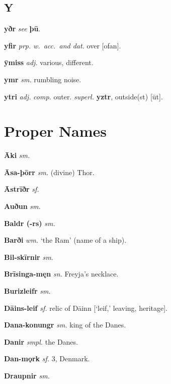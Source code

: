\documentclass[12pt,letterpaper]{book}
\newcommand\emptypage{\clearpage{\pagestyle{empty}\cleardoublepage}}
\begin{document}
\emptypage

\chapter*{Y}

\noindent
\textbf{yðr} \textit{} \textit{see} \textbf{þū}.

\noindent
\textbf{yfir} \textit{prp.} \textit{w.\ acc.\ and dat.} over [ofan].

\noindent
\textbf{ȳmiss} \textit{adj.} various, different.

\noindent
\textbf{ymr} \textit{sm.} rumbling noise.

\noindent
\textbf{ytri} \textit{adj.} \textit{comp.} outer.  \textit{superl.} \textbf{yztr},
	outside(st) [ūt].



\part{Proper Names}

\noindent
\textbf{Āki} \textit{sm.} 

\noindent
\textbf{Āsa-þōrr} \textit{sm.} (divine) Thor.

\noindent
\textbf{Āstrīðr} \textit{sf.} 

\noindent
\textbf{Auðun} \textit{sm.} 

\vspace{\baselineskip}

\noindent
\textbf{Baldr (-rs)} \textit{sm.} 

\noindent
\textbf{Barði} \textit{wm.} `the Ram' (name of a ship).

\noindent
\textbf{Bil-skīrnir} \textit{sm.} 

\noindent
\textbf{Brīsinga-męn} \textit{sn.} Freyja's necklace.

\noindent
\textbf{Burizleifr} \textit{sm.} 

\vspace{\baselineskip}

\noindent
\textbf{Dāins-leif} \textit{sf.} relic of Dāinn [`leif,' leaving, heritage].

\noindent
\textbf{Dana-konungr} \textit{sm.} king of the Danes.

\noindent
\textbf{Danir} \textit{smpl.} the Danes.

\noindent
\textbf{Dan-mǫrk} \textit{sf.} 3, Denmark.

\noindent
\textbf{Draupnir} \textit{sm.} 
\end{document}
